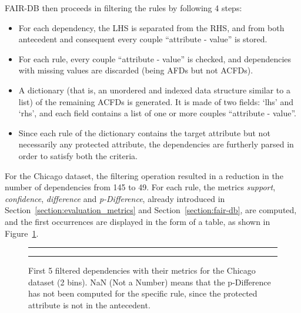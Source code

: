 \begin{itemize}
FAIR-DB then proceeds in filtering the rules by following 4 steps:
\begin{itemize}
\item[1.] For each dependency, the LHS is separated from the RHS, and from both antecedent and consequent every couple ``attribute - value'' is stored.
\item[2.] For each rule, every couple ``attribute - value'' is checked, and dependencies with missing values are discarded (being AFDs but not ACFDs).
\item[3.] A dictionary (that is, an unordered and indexed data structure similar to a list) of the remaining ACFDs is generated. It is made of two fields: `lhs' and `rhs', and each field contains a list of one or more couples ``attribute - value''.
\item[4.] Since each rule of the dictionary contains the target attribute but not necessarily any protected attribute, the dependencies are furtherly parsed in order to satisfy both the criteria.
\end{itemize}

For the Chicago dataset, the filtering operation resulted in a reduction in the number of dependencies from 145 to 49. For each rule, the metrics \textit{support}, \textit{confidence}, \textit{difference} and \textit{p-Difference}, already introduced in Section~\ref{section:evaluation_metrics} and Section~\ref{section:fair-db}, are computed, and the first occurrences are displayed in the form of a table, as shown in Figure~\ref{fig:chicago_fair-db2}.

\begin{figure}[t!]
\centering
\noindent\rule{\linewidth}{0.4pt}\par
\noindent\rule{\linewidth}{0.4pt}
\caption{First 5 filtered dependencies with their metrics for the Chicago dataset (2 bins). NaN (Not a Number) means that the p-Difference has not been computed for the specific rule, since the protected attribute is not in the antecedent.}
\label{fig:chicago_fair-db2}
\end{figure}


\end{itemize}
